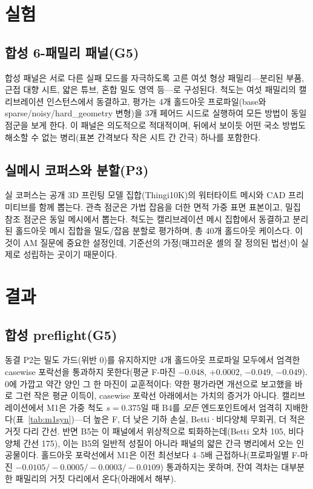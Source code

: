 \documentclass[11pt]{article}
\begin{document}
\section{실험}
\subsection{합성 6-패밀리 패널(G5)}
합성 패널은 서로 다른 실패 모드를 자극하도록 고른 여섯 형상 패밀리---분리된 부품, 근접 대향 시트,
얇은 튜브, 혼합 밀도 영역 등---로 구성된다. 척도는 여섯 패밀리의 캘리브레이션 인스턴스에서 동결하고,
평가는 4개 홀드아웃 프로파일(base와 sparse/noisy/hard\_geometry 변형)을 3개 페어드 시드로 실행하여
모든 방법이 동일 점군을 보게 한다. 이 패널은 의도적으로 적대적이며, 뒤에서 보이듯 어떤 국소 방법도
해소할 수 없는 병리(표본 간격보다 작은 시트 간 간극) 하나를 포함한다.

\subsection{실메시 코퍼스와 분할(P3)}
실 코퍼스는 공개 3D 프린팅 모델 집합(Thingi10K)의 워터타이트 메시와 CAD 프리미티브를 함께 뽑는다.
관측 점군은 가법 잡음을 더한 면적 가중 표면 표본이고, 밀집 참조 점군은 동일 메시에서 뽑는다. 척도는
캘리브레이션 메시 집합에서 동결하고 분리된 홀드아웃 메시 집합을 밀도/잡음 분할로 평가하며, 총 40개
홀드아웃 케이스다. 이것이 AM 질문에 중요한 설정인데, 기준선의 가정(매끄러운 셸의 잘 정의된 법선)이
실제로 성립하는 곳이기 때문이다.

\section{결과}
\subsection{합성 preflight(G5)}
동결 P2는 밀도 가드(위반 0)를 유지하지만 4개 홀드아웃 프로파일 모두에서 엄격한 casewise 포락선을
통과하지 못한다(평균 F-마진 $-0.048$, $+0.0002$, $-0.049$, $-0.049$). 0에 가깝고 약간 양인 그
한 마진이 교훈적이다: 약한 평가라면 개선으로 보고했을 바로 그런 작은 평균 이득이, casewise 포락선
아래에서는 가치의 증거가 아니다. 캘리브레이션에서 M1은 가중 척도 $s=0.375$일 때 B4를 \emph{모든}
엔드포인트에서 엄격히 지배한다(표~\ref{tab:m1syn})---더 높은 F, 더 낮은 기하 손실, Betti·비다양체
무회귀, 더 적은 거짓 다리 간선. 반면 B5는 이 패널에서 위상적으로 퇴화하는데(Betti 오차 105,
비다양체 간선 175), 이는 B5의 일반적 성질이 아니라 패널의 얇은 간극 병리에서 오는 인공물이다.
홀드아웃 포락선에서 M1은 이전 최선보다 4--5배 근접하나(프로파일별 F-마진
$-0.0105/{-}0.0005/{-}0.0003/{-}0.0109$) 통과하지는 못하며, 잔여 격차는 대부분 한 패밀리의 거짓
다리에서 온다(아래에서 해부).
\end{document}
